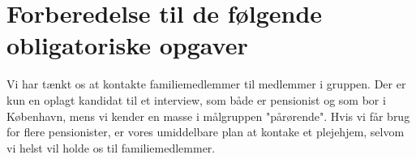 \section{Forberedelse til de følgende obligatoriske opgaver}
Vi har tænkt os at kontakte familiemedlemmer til medlemmer i gruppen. Der er kun en oplagt kandidat til et
interview, som både er pensionist og som bor i København, mens vi kender en masse i målgruppen "pårørende".
Hvis vi får brug for flere pensionister, er vores umiddelbare plan at kontake et plejehjem, selvom vi helst
vil holde os til familiemedlemmer.
